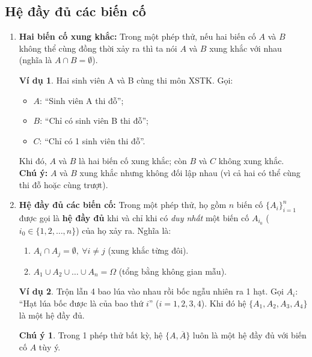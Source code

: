 \documentclass[12pt,a4paper]{article}
\theoremstyle{definition}
\newtheorem{vidu}{Ví dụ}[section]
\newtheorem{chuy}{Chú ý}[section]
\begin{document}
\subsection{Hệ đầy đủ các biến cố}
\begin{enumerate}[label=\alph*), leftmargin=1.5em]
    \item \textbf{Hai biến cố xung khắc:}
    Trong một phép thử, nếu hai biến cố $A$ và $B$ không thể cùng đồng thời xảy ra thì ta nói $A$ và $B$ xung khắc với nhau (nghĩa là $A \cap B = \emptyset$).

    \begin{vidu}
    Hai sinh viên A và B cùng thi môn XSTK. Gọi:
    \begin{itemize}
        \item $A$: ``Sinh viên A thi đỗ'';
        \item $B$: ``Chỉ có sinh viên B thi đỗ'';
        \item $C$: ``Chỉ có 1 sinh viên thi đỗ''.
    \end{itemize}
    Khi đó, $A$ và $B$ là hai biến cố xung khắc; còn $B$ và $C$ không xung khắc.\\
    \textbf{Chú ý:} $A$ và $B$ xung khắc nhưng không đối lập nhau (vì cả hai có thể cùng thi đỗ hoặc cùng trượt).
    \end{vidu}

    \item \textbf{Hệ đầy đủ các biến cố:}
    Trong một phép thử, họ gồm $n$ biến cố $\{A_i\}_{i=1}^n$ được gọi là \textbf{hệ đầy đủ} khi và chỉ khi có \textit{duy nhất} một biến cố $A_{i_0}$ ($i_0 \in \{1, 2, \dots, n\}$) của họ xảy ra. Nghĩa là:
    \begin{enumerate}[label=\arabic*)]
        \item $A_i \cap A_j = \emptyset,\ \forall i \ne j$ (xung khắc từng đôi).
        \item $A_1 \cup A_2 \cup \dots \cup A_n = \Omega$ (tổng bằng không gian mẫu).
    \end{enumerate}

    \begin{vidu}
    Trộn lẫn 4 bao lúa vào nhau rồi bốc ngẫu nhiên ra 1 hạt.
    Gọi $A_i$: ``Hạt lúa bốc được là của bao thứ $i$'' ($i = 1, 2, 3, 4$).
    Khi đó hệ $\{A_1, A_2, A_3, A_4\}$ là một hệ đầy đủ.
    \end{vidu}

    \begin{chuy}
    Trong 1 phép thử bất kỳ, hệ $\{A, \overline{A}\}$ luôn là một hệ đầy đủ với biến cố $A$ tùy ý.
    \end{chuy}
\end{enumerate}
\end{document}

